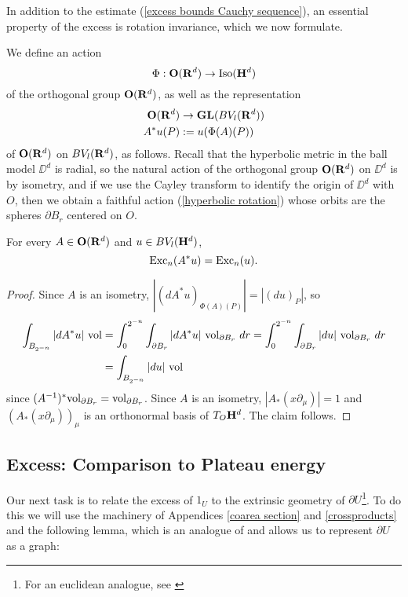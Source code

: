 In addition to the estimate (\ref{excess bounds Cauchy sequence}), an essential property of the excess is rotation invariance, which we now formulate.

\begin{notation}
We define an action
\begin{equation}\label{hyperbolic rotation}
    \Phi: \mathbf{O}(\mathbf{R}^d) \to \operatorname{Iso}(\mathbf H^d)
\end{equation}
of the orthogonal group $\mathbf{O}(\mathbf{R}^d)$, as well as the representation
\begin{align*}
\mathbf{O}(\mathbf{R}^d) &\to \mathbf{GL}(BV_l(\mathbf{R}^d))\\
A^* u(P) &:= u(\Phi(A)(P))
\end{align*}
of $\mathbf{O}(\mathbf{R}^d)$ on $BV_l(\mathbf{R}^d)$, as follows.
Recall that the hyperbolic metric in the ball model $\DD^d$ is radial, so the natural action of the orthogonal group $\mathbf{O}(\mathbf{R}^d)$ on $\DD^d$ is by isometry, and if we use the Cayley transform to identify the origin of $\DD^d$ with $O$, then we obtain a faithful action (\ref{hyperbolic rotation}) whose orbits are the spheres $\partial B_r$ centered on $O$.
\end{notation}

\begin{lemma}\label{excess rotation invariant}
For every $A \in \mathbf{O}(\mathbf{R}^d)$ and $u \in BV_l(\mathbf H^d)$,
$$\operatorname{Exc}_n(A^* u) = \operatorname{Exc}_n(u).$$
\end{lemma}
\begin{proof}
Since $A$ is an isometry, $|(d A^* u)_{\Phi(A)(P)}| = |(du)_P|$, so
\begin{align*}
\int_{B_{2^{-n}}} |dA^*u| ~\mathrm{vol} &= \int_0^{2^{-n}} \int_{\partial B_r} |dA^* u| ~\mathrm{vol}_{\partial B_r} ~dr = \int_0^{2^{-n}} \int_{\partial B_r} |du| ~\mathrm{vol}_{\partial B_r} ~dr\\
&= \int_{B_{2^{-n}}} |du| ~\mathrm{vol}
\end{align*}
since $(A^{-1})^* \mathrm{vol}_{\partial B_r} = \mathrm{vol}_{\partial B_r}$.
Since $A$ is an isometry, $|A_* (x \partial_\mu)| = 1$ and $(A_*(x \partial_\mu))_\mu$ is an orthonormal basis of $T_O \mathbf H^d$.
The claim follows.
\end{proof}

\subsection{Excess: Comparison to Plateau energy}
Our next task is to relate the excess of $1_U$ to the extrinsic geometry of $\partial U$\footnote{For an euclidean analogue, see \cite[TODO]{Miranda66}}.
To do this we will use the machinery of Appendices \ref{coarea section} and \ref{crossproducts} and the following lemma, which is an analogue of \cite[Theorem 4.8]{Giusti77} and allows us to represent $\partial U$ as a graph:

